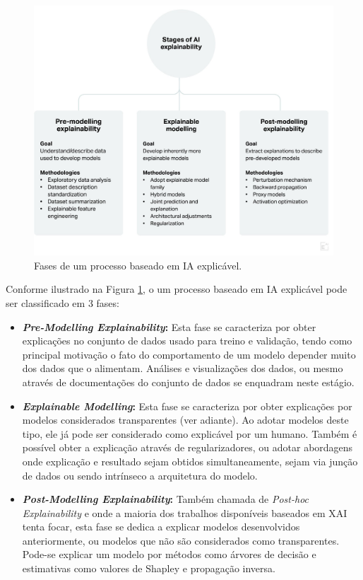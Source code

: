 \documentclass[portugues]{ic-tese}
\begin{document}
\begin{figure}[h]
\centering
\includegraphics[scale=0.2]{images/phases.jpeg}
\caption {Fases de um processo baseado em IA explicável.}
\label{fig:StagesExplainableAI}
\end{figure}

Conforme ilustrado na Figura \ref{fig:StagesExplainableAI}, o um processo baseado em IA explicável pode ser classificado em 3 fases:

\begin{itemize}
\item \textbf{\textit{Pre-Modelling Explainability}:} Esta fase se caracteriza por obter explicações no conjunto de dados usado para treino e validação, tendo como principal motivação o fato do comportamento de um modelo depender muito dos dados que o alimentam. Análises e visualizações dos dados, ou mesmo através de documentações do conjunto de dados se enquadram neste estágio.~\citep{Khalegi_2019_Pre} 
\item \textbf{\textit{Explainable Modelling}:} Esta fase se caracteriza por obter explicações por modelos considerados transparentes (ver adiante). Ao adotar modelos deste tipo, ele já pode ser considerado como explicável por um humano. Também é possível obter a explicação através de regularizadores, ou adotar abordagens onde explicação e resultado sejam obtidos simultaneamente, sejam via junção de dados ou sendo intrínseco a arquitetura do modelo.~\citep{Khalegi_2019}
\item \textbf{\textit{Post-Modelling Explainability}:} Também chamada de \textit{Post-hoc Explainability} e onde a maioria dos trabalhos disponíveis baseados em XAI tenta focar, esta fase se dedica a explicar modelos desenvolvidos anteriormente, ou modelos que não são considerados como transparentes. Pode-se explicar um modelo por métodos como árvores de decisão e estimativas como valores de Shapley e propagação inversa.~\citep{Khalegi_2019_Post}
\end{itemize}
\end{document}
